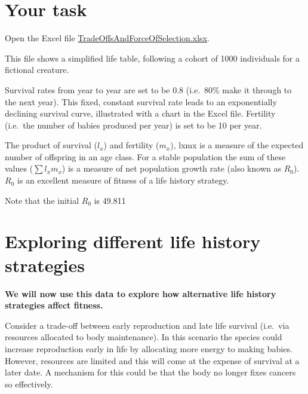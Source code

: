 \documentclass[
  a4paper]{book}
\begin{document}
\section{Your task}\label{your-task-10}

Open the Excel file \href{https://www.dropbox.com/s/7eyoencvqc3hwv7/TradeOffsAndForceOfSelection.xlsx?dl=1}{TradeOffsAndForceOfSelection.xlsx}.

This file shows a simplified life table, following a cohort of 1000 individuals for a fictional creature.

Survival rates from year to year are set to be 0.8 (i.e.~80\% make it through to the next year). This fixed, constant survival rate leads to an exponentially declining survival curve, illustrated with a chart in the Excel file. Fertility (i.e.~the number of babies produced per year) is set to be 10 per year.

The product of survival (\(l_x\)) and fertility (\(m_x\)), lxmx is a measure of the expected number of offspring in an age class. For a stable population the sum of these values (\(\sum l_x m_x\)) is a measure of net population growth rate (also known as \(R_0\)). \(R_0\) is an excellent measure of fitness of a life history strategy.

Note that the initial \(R_0\) is 49.811

\section{Exploring different life history strategies}\label{exploring-different-life-history-strategies}

\textbf{We will now use this data to explore how alternative life history strategies affect fitness.}

Consider a trade-off between early reproduction and late life survival (i.e.~via resources allocated to body maintenance). In this scenario the species could increase reproduction early in life by allocating more energy to making babies. However, resources are limited and this will come at the expense of survival at a later date. A mechanism for this could be that the body no longer fixes cancers so effectively.
\end{document}

